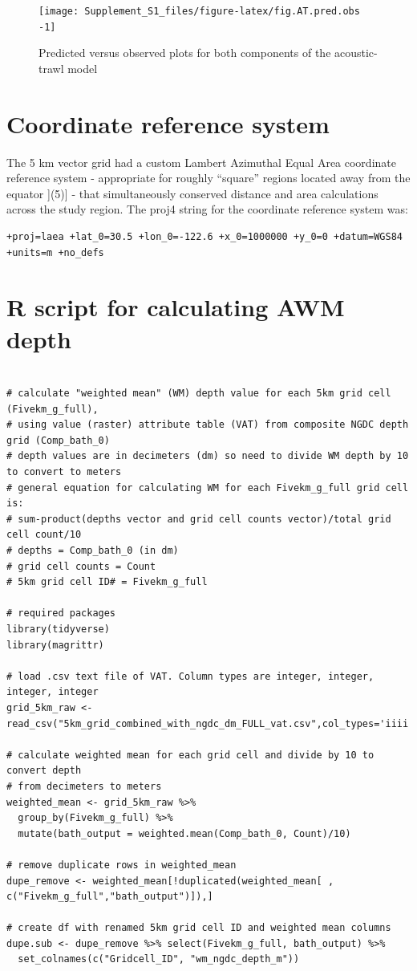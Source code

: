 \documentclass[
]{article}
\begin{document}
\begin{figure}
\texttt{[image: Supplement\_S1\_files/figure-latex/fig.AT.pred.obs -1]} \caption{\label{fig:AT.pred.obs} Predicted versus observed plots for both components of the acoustic-trawl model}\label{fig:fig.AT.pred.obs }
\end{figure}

\newpage
\clearpage

\hypertarget{coordinate-reference-system}{%
\section{Coordinate reference
system}\label{coordinate-reference-system}}

The 5 km vector grid had a custom Lambert Azimuthal Equal Area
coordinate reference system - appropriate for roughly ``square'' regions
located away from the equator {]}(5){]} - that simultaneously conserved
distance and area calculations across the study region. The proj4 string
for the coordinate reference system was:

\begin{verbatim}
+proj=laea +lat_0=30.5 +lon_0=-122.6 +x_0=1000000 +y_0=0 +datum=WGS84 +units=m +no_defs
\end{verbatim}

\hypertarget{r-script-for-calculating-awm-depth}{%
\section{R script for calculating AWM
depth}\label{r-script-for-calculating-awm-depth}}

\begin{verbatim}

# calculate "weighted mean" (WM) depth value for each 5km grid cell (Fivekm_g_full),
# using value (raster) attribute table (VAT) from composite NGDC depth grid (Comp_bath_0)
# depth values are in decimeters (dm) so need to divide WM depth by 10 to convert to meters
# general equation for calculating WM for each Fivekm_g_full grid cell is:
# sum-product(depths vector and grid cell counts vector)/total grid cell count/10
# depths = Comp_bath_0 (in dm)
# grid cell counts = Count
# 5km grid cell ID# = Fivekm_g_full

# required packages
library(tidyverse)
library(magrittr)

# load .csv text file of VAT. Column types are integer, integer, integer, integer
grid_5km_raw <- read_csv("5km_grid_combined_with_ngdc_dm_FULL_vat.csv",col_types='iiii')

# calculate weighted mean for each grid cell and divide by 10 to convert depth
# from decimeters to meters
weighted_mean <- grid_5km_raw %>%
  group_by(Fivekm_g_full) %>% 
  mutate(bath_output = weighted.mean(Comp_bath_0, Count)/10)

# remove duplicate rows in weighted_mean
dupe_remove <- weighted_mean[!duplicated(weighted_mean[ , c("Fivekm_g_full","bath_output")]),]

# create df with renamed 5km grid cell ID and weighted mean columns
dupe.sub <- dupe_remove %>% select(Fivekm_g_full, bath_output) %>%
  set_colnames(c("Gridcell_ID", "wm_ngdc_depth_m"))
\end{verbatim}
\end{document}
